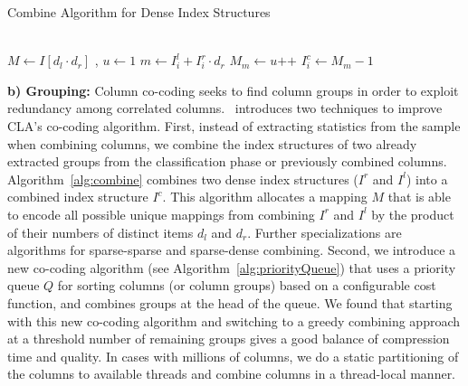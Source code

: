 \begin{algorithm}[!t]
  \caption{Combine Algorithm for Dense Index Structures}\label{alg:combine}
  \begin{algorithmic}
    \\
    \State $ M \gets I[d_l \cdot d_r]$ , $u \gets 1$ 
    \State $m \gets I^l_i + I^r_i \cdot d_r$ 
     
    \State $ M_m \gets u\texttt{++} $ 
    \EndIf
    \State $ I^c_i \gets M_m - 1$ 
    \EndFor
  \end{algorithmic}
\end{algorithm}


\textbf{b) Grouping:} Column co-coding seeks to find column groups in order to exploit redundancy among correlated columns. \name\ introduces two techniques to improve CLA's co-coding algorithm.
%
First, instead of extracting statistics from the sample when combining columns, we combine the index structures of two already extracted groups from the classification phase or previously combined columns. Algorithm~\ref{alg:combine} combines two dense index structures ($I^r$ and $I^l$) into a combined index structure $I^c$. This algorithm allocates a mapping $M$ that is able to encode all possible unique mappings from combining $I^r$ and $I^l$ by the product of their numbers of distinct items $d_l$ and $d_r$. Further specializations are algorithms for sparse-sparse and sparse-dense combining.
%
Second, we introduce a new co-coding algorithm (see Algorithm~\ref{alg:priorityQueue}) that uses a priority queue $Q$ for sorting columns (or column groups) based on a configurable cost function, and combines groups at the head of the queue. We found that starting with this new co-coding algorithm and switching to a greedy combining approach at a threshold number of remaining groups gives a good balance of compression time and quality. In cases with millions of columns, we do a static partitioning of the columns to available threads and combine columns in a thread-local manner.

